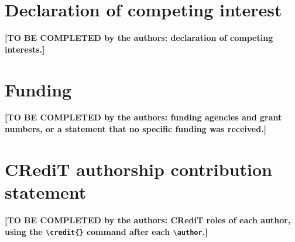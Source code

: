 \documentclass[a4paper,fleqn]{cas-sc}
\begin{document}
\section*{Declaration of competing interest}
\textbf{[TO BE COMPLETED by the authors: declaration of competing interests.]}

\section*{Funding}
\textbf{[TO BE COMPLETED by the authors: funding agencies and grant numbers, or a statement that no specific funding was received.]}

\section*{CRediT authorship contribution statement}
\textbf{[TO BE COMPLETED by the authors: CRediT roles of each author, using the \texttt{\textbackslash credit\{\}} command after each \texttt{\textbackslash author}.]}

\printcredits

%





\end{document}
